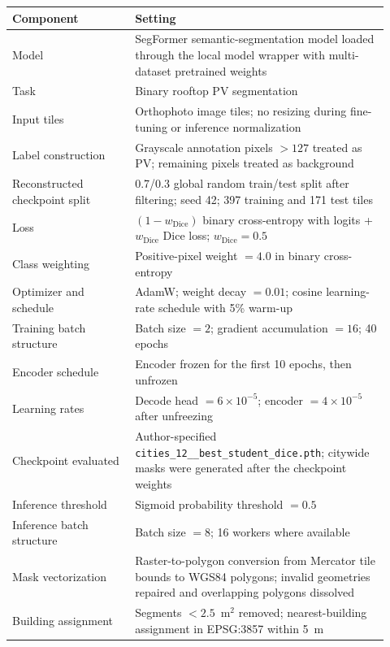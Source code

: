 {\scriptsize
\begin{tabular}{p{0.30\linewidth}p{0.62\linewidth}}
\toprule
Component & Setting \\
\midrule
Model & SegFormer semantic-segmentation model loaded through the local model wrapper with multi-dataset pretrained weights \\
Task & Binary rooftop PV segmentation \\
Input tiles & Orthophoto image tiles; no resizing during fine-tuning or inference normalization \\
Label construction & Grayscale annotation pixels $>127$ treated as PV; remaining pixels treated as background \\
Reconstructed checkpoint split & 0.7/0.3 global random train/test split after filtering; seed 42; 397 training and 171 test tiles \\
Loss & $(1-w_{\mathrm{Dice}})$ binary cross-entropy with logits + $w_{\mathrm{Dice}}$ Dice loss; $w_{\mathrm{Dice}}=0.5$ \\
Class weighting & Positive-pixel weight $=4.0$ in binary cross-entropy \\
Optimizer and schedule & AdamW; weight decay $=0.01$; cosine learning-rate schedule with 5\% warm-up \\
Training batch structure & Batch size $=2$; gradient accumulation $=16$; 40 epochs \\
Encoder schedule & Encoder frozen for the first 10 epochs, then unfrozen \\
Learning rates & Decode head $=6\times10^{-5}$; encoder $=4\times10^{-5}$ after unfreezing \\
Checkpoint evaluated & Author-specified \texttt{cities\_12\_\_best\_student\_dice.pth}; citywide masks were generated after the checkpoint weights \\
Inference threshold & Sigmoid probability threshold $=0.5$ \\
Inference batch structure & Batch size $=8$; 16 workers where available \\
Mask vectorization & Raster-to-polygon conversion from Mercator tile bounds to WGS84 polygons; invalid geometries repaired and overlapping polygons dissolved \\
Building assignment & Segments $<2.5$~m$^{2}$ removed; nearest-building assignment in EPSG:3857 within 5~m \\
\bottomrule
\end{tabular}
}
